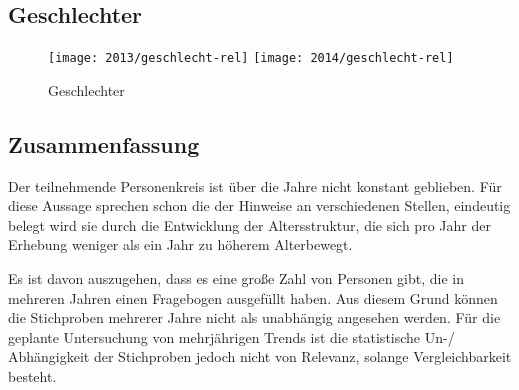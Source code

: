 \documentclass[11pt]{scrartcl}
\begin{document}
\subsection{Geschlechter}

\begin{figure}[htbp]
	\centering
	\texttt{[image: 2013/geschlecht-rel]}\hfill
	\texttt{[image: 2014/geschlecht-rel]}
	\caption{Geschlechter}
	\label{fig:geschlecht}
\end{figure}

\subsection{Zusammenfassung}

Der teilnehmende Personenkreis ist über die Jahre nicht konstant geblieben.
Für diese Aussage sprechen schon die der Hinweise an verschiedenen Stellen,
eindeutig belegt wird sie durch die Entwicklung der Altersstruktur,
die sich pro Jahr der Erhebung weniger als ein Jahr zu höherem Alterbewegt.

Es ist davon auszugehen, dass es eine große Zahl von Personen gibt,
die in mehreren Jahren einen Fragebogen ausgefüllt haben.
Aus diesem Grund können die Stichproben mehrerer Jahre
nicht als unabhängig angesehen werden.
Für die geplante Untersuchung von mehrjährigen Trends
ist die statistische Un-/ Abhängigkeit der Stichproben jedoch nicht von Relevanz,
solange Vergleichbarkeit besteht.

\clearpage
{}

\end{document}
